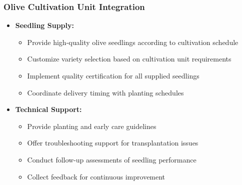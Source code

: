 \subsubsection{Olive Cultivation Unit Integration} \label{sec:nursery_olive_integration}
\begin{itemize}
    \item \textbf{Seedling Supply:}
    \begin{itemize}
        \item Provide high-quality olive seedlings according to cultivation schedule
        \item Customize variety selection based on cultivation unit requirements
        \item Implement quality certification for all supplied seedlings
        \item Coordinate delivery timing with planting schedules
    \end{itemize}
    
    \item \textbf{Technical Support:}
    \begin{itemize}
        \item Provide planting and early care guidelines
        \item Offer troubleshooting support for transplantation issues
        \item Conduct follow-up assessments of seedling performance
        \item Collect feedback for continuous improvement
    \end{itemize}
\end{itemize}

